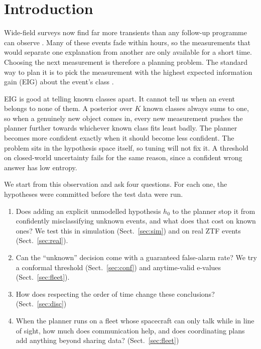 \documentclass{jaa}
\begin{document}
\section{Introduction}\label{sec:intro}

Wide-field surveys now find far more transients than any follow-up programme can observe \citep{Bellm2019,Ivezic2019}. Many of these events fade within hours, so the measurements that would separate one explanation from another are only available for a short time. Choosing the next measurement is therefore a planning problem. The standard way to plan it is to pick the measurement with the highest expected information gain (EIG) about the event's class \citep{Lindley1956,Chaloner1995}.

EIG is good at telling known classes apart. It cannot tell us when an event belongs to none of them. A posterior over $K$ known classes always sums to one, so when a genuinely new object comes in, every new measurement pushes the planner further towards whichever known class fits least badly. The planner becomes more confident exactly when it should become less confident. The problem sits in the hypothesis space itself, so tuning will not fix it. A threshold on closed-world uncertainty fails for the same reason, since a confident wrong answer has low entropy.

We start from this observation and ask four questions. For each one, the hypotheses were committed before the test data were run.
\begin{enumerate}
\item Does adding an explicit unmodelled hypothesis $h_0$ to the planner stop it from confidently misclassifying unknown events, and what does that cost on known ones? We test this in simulation (Sect.~\ref{sec:sim}) and on real ZTF events (Sect.~\ref{sec:real}).
\item Can the ``unknown'' decision come with a guaranteed false-alarm rate? We try a conformal threshold (Sect.~\ref{sec:conf}) and anytime-valid e-values (Sect.~\ref{sec:fleet}).
\item How does respecting the order of time change these conclusions? (Sect.~\ref{sec:disc})
\item When the planner runs on a fleet whose spacecraft can only talk while in line of sight, how much does communication help, and does coordinating plans add anything beyond sharing data? (Sect.~\ref{sec:fleet})
\end{enumerate}
\end{document}
